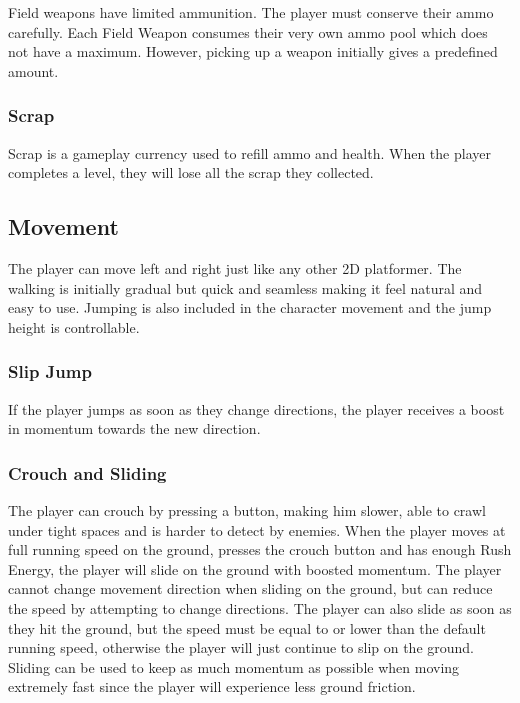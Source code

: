 \documentclass[12pt]{article}
\begin{document}
Field weapons have limited ammunition. The player must conserve their ammo carefully. Each Field Weapon consumes their very own ammo pool which does not have a maximum. However, picking up a weapon initially gives a predefined amount. 

\subsubsection{Scrap}

Scrap is a gameplay currency used to refill ammo and health. When the player completes a level, they will lose all the scrap they collected. 

\subsection{Movement}

The player can move left and right just like any other 2D platformer. The walking is initially gradual but quick and seamless making it feel natural and easy to use. Jumping is also included in the character movement and the jump height is controllable.

\subsubsection{Slip Jump}

If the player jumps as soon as they change directions, the player receives a boost in momentum towards the new direction.

\subsubsection{Crouch and Sliding}

The player can crouch by pressing a button, making him slower, able to crawl under tight spaces and is harder to detect by enemies. When the player moves at full running speed on the ground, presses the crouch button and has enough Rush Energy, the player will slide on the ground with boosted momentum. The player cannot change movement direction when sliding on the ground, but can reduce the speed by attempting to change directions. The player can also slide as soon as they hit the ground, but the speed must be equal to or lower than the default running speed, otherwise the player will just continue to slip on the ground. Sliding can be used to keep as much momentum as possible when moving extremely fast since the player will experience less ground friction. 
\end{document}
